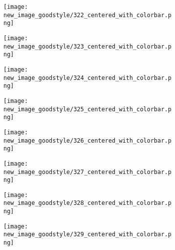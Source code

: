 \documentclass[a4paper,12pt]{article}
\begin{document}
\begin{figure}[H]
  \begin{subfigure}{0.11\textwidth}
    \texttt{[image: new\_image\_goodstyle/322\_centered\_with\_colorbar.png]}
  \end{subfigure}
  \hfill
  \begin{subfigure}{0.11\textwidth}
    \texttt{[image: new\_image\_goodstyle/323\_centered\_with\_colorbar.png]}
  \end{subfigure}
  \hfill
  \begin{subfigure}{0.11\textwidth}
    \texttt{[image: new\_image\_goodstyle/324\_centered\_with\_colorbar.png]}
  \end{subfigure}
  \hfill
  \begin{subfigure}{0.11\textwidth}
    \texttt{[image: new\_image\_goodstyle/325\_centered\_with\_colorbar.png]}
  \end{subfigure}
  \hfill
  \begin{subfigure}{0.11\textwidth}
    \texttt{[image: new\_image\_goodstyle/326\_centered\_with\_colorbar.png]}
  \end{subfigure}
  \hfill
  \begin{subfigure}{0.11\textwidth}
    \texttt{[image: new\_image\_goodstyle/327\_centered\_with\_colorbar.png]}
  \end{subfigure}
  \hfill
  \begin{subfigure}{0.11\textwidth}
    \texttt{[image: new\_image\_goodstyle/328\_centered\_with\_colorbar.png]}
  \end{subfigure}
  \hfill
  \begin{subfigure}{0.11\textwidth}
    \texttt{[image: new\_image\_goodstyle/329\_centered\_with\_colorbar.png]}
  \end{subfigure}
  \hfill
\end{figure}
\end{document}
